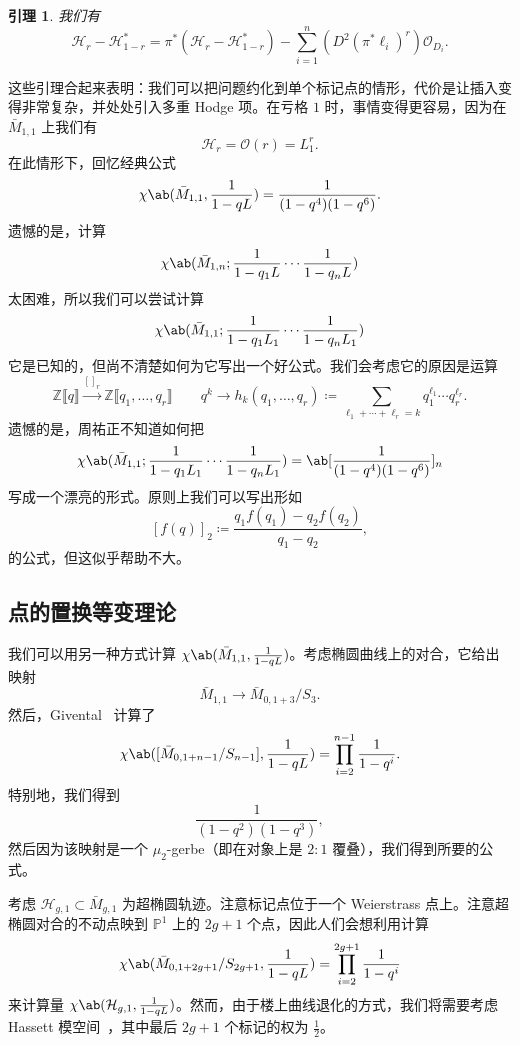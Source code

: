 \documentclass{amsart}
\newtheorem{lem}[thm]{引理}
\theoremstyle{definition}
\theoremstyle{remark}
\theoremstyle{plain}
\theoremstyle{definition}
\theoremstyle{remark}
\newcommand{\Z}{\mathbb{Z}}
\renewcommand{\P}{\mathbb{P}}
\newcommand{\mc}[1]{\mathcal{#1}}
\newcommand{\1}{\mathbf{1}}
\newcommand{\2}{\mathbf{2}}
\newcommand{\3}{\mathbf{3}}
\newcommand{\ps}[1]{\llbracket #1 \rrbracket}
\begin{document}
\begin{lem}
    我们有
    \[ \mc{H}_r - \mc{H}_{1-r}^* = \pi^* (\mc{H}_r - \mc{H}_{1-r}^*) - \sum_{i=1}^n (D^2 (\pi^* \ell_i)^r) \mc{O}_{D_i}. \]
\end{lem}

这些引理合起来表明：我们可以把问题约化到单个标记点的情形，代价是让插入变得非常复杂，并处处引入多重 Hodge 项。在亏格 \(1\) 时，事情变得更容易，因为在 \(\bar{M}_{1,1}\) 上我们有
\[ \mc{H}_r = \mc{O}(r) = L_1^r. \]
在此情形下，回忆经典公式
\[ \chi\ab(\bar{M}_{1,1}, \frac{1}{1-qL}) = \frac{1}{(1-q^4)(1-q^6)}. \]
遗憾的是，计算
\[ \chi\ab(\bar{M}_{1,n}; \frac{1}{1-q_1 L} \cdots \frac{1}{1-q_n L}) \]
太困难，所以我们可以尝试计算
\[ \chi\ab(\bar{M}_{1,1}; \frac{1}{1-q_1 L_1} \cdots \frac{1}{1-q_n L_1})  \]
它是已知的，但尚不清楚如何为它写出一个好公式。我们会考虑它的原因是运算
\[ \Z\ps{q} \xrightarrow{[]_r} \Z\ps{q_1, \ldots, q_r} \qquad q^k \to h_k(q_1, \ldots, q_r) \coloneqq \sum_{\ell_1 + \cdots + \ell_r = k} q_1^{\ell_1} \cdots q_r^{\ell_r}. \]
遗憾的是，周祐正不知道如何把
\[ \chi\ab(\bar{M}_{1,1}; \frac{1}{1-q_1 L_1} \cdots \frac{1}{1-q_n L_1}) = \ab[\frac{1}{(1-q^4)(1-q^6)}]_n \]
写成一个漂亮的形式。原则上我们可以写出形如
\[ [f(q)]_2 \coloneqq \frac{q_1 f(q_1) - q_2 f(q_2)}{q_1 - q_2}, \]
的公式，但这似乎帮助不大。

\subsection{点的置换等变理论}%
\label{sub:Permutation-equivariant theory of a point}

我们可以用另一种方式计算 \(\chi\ab(\bar{M}_{1,1}, \frac{1}{1-q L})\)。考虑椭圆曲线上的对合，它给出映射
\[ \bar{M}_{1,1} \to \bar{M}_{0,1+3}/S_3. \]
然后，Givental~\cite{Givental2017K1} 计算了
\[ \chi\ab([\bar{M}_{0,1+n-1}/S_{n-1}], \frac{1}{1-qL}) = \prod_{i=2}^{n-1} \frac{1}{1-q^i}. \]
特别地，我们得到
\[ \frac{1}{(1-q^2)(1-q^3)}, \]
然后因为该映射是一个 \(\mu_2\)-gerbe（即在对象上是 \(2:1\) 覆叠），我们得到所要的公式。

考虑 \(\mc{H}_{g,1} \subset \bar{M}_{g,1}\) 为超椭圆轨迹。注意标记点位于一个 Weierstrass 点上。注意超椭圆对合的不动点映到 \(\P^1\) 上的 \(2g+1\) 个点，因此人们会想利用计算
\[ \chi\ab(\bar{M}_{0,1+2g+1}/S_{2g+1}, \frac{1}{1-q L}) = \prod_{i=2}^{2g+1} \frac{1}{1-q^i} \]
来计算量
\(\chi\ab(\mc{H}_{g,1}, \frac{1}{1-qL})\)。然而，由于楼上曲线退化的方式，我们将需要考虑 Hassett 模空间~\cite{Hassett2003}，其中最后 \(2g+1\) 个标记的权为 \(\frac{1}{2}\)。
\end{document}
